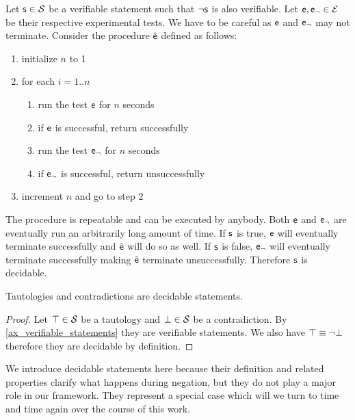 \documentclass[11pt,letterpaper,fleqn]{memoir} %
\begin{document}
\begin{mathSection}
\begin{justification}
		Let $\mathsf{s} \in \mathcal{S}$ be a verifiable statement such that $\neg\mathsf{s}$ is also verifiable. Let $\mathsf{e}, \mathsf{e}_\neg \in \mathcal{E}$ be their respective experimental tests. We have to be careful as $\mathsf{e}$ and $\mathsf{e}_\neg$ may not terminate. Consider the procedure $\hat{\mathsf{e}}$ defined as follows:
		\begin{enumerate}
			\item initialize $n$ to 1
			\item for each $i=1..n$
			\begin{enumerate}
				\item run the test $\mathsf{e}$ for $n$ seconds
				\item if $\mathsf{e}$ is successful, return successfully
				\item run the test $\mathsf{e}_\neg$ for $n$ seconds
				\item if $\mathsf{e}_\neg$ is successful, return unsuccessfully
			\end{enumerate}
			\item increment $n$ and go to step 2
		\end{enumerate}
	    The procedure is repeatable and can be executed by anybody. Both $\mathsf{e}$ and $\mathsf{e}_\neg$ are eventually run an arbitrarily long amount of time. If $\mathsf{s}$ is true, $\mathsf{e}$ will eventually terminate successfully and $\hat{\mathsf{e}}$ will do so as well. If $\mathsf{s}$ is false, $\mathsf{e}_\neg$ will eventually terminate successfully making $\hat{\mathsf{e}}$ terminate unsuccessfully. Therefore $\mathsf{s}$ is decidable.
	\end{justification}

\begin{coro}
	Tautologies and contradictions are decidable statements.
\end{coro}
\begin{proof}
	Let $\top \in \mathcal{S}$ be a tautology and $\bot \in \mathcal{S}$ be a contradiction. By \ref{ax_verifiable_statements} they are verifiable statements. We also have $\top \equiv \neg \bot$ therefore they are decidable by definition.
\end{proof}

\end{mathSection}

We introduce decidable statements here because their definition and related properties clarify what happens during negation, but they do not play a major role in our framework. They represent a special case which will we turn to time and time again over the course of this work.
\end{document}
